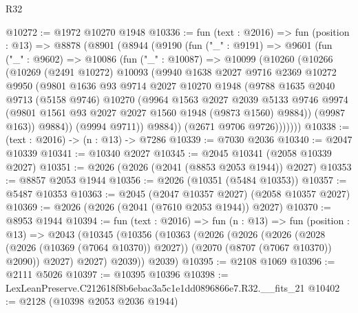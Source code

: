 \begin{lexlean}{R32}
\begin{coremodule}
@10272 := @1972 @10270 @1948
@10336 := fun (text : @2016) =>
  fun (position : @13) =>
  @8878
    (@8901
      (@8944
        (@9190
          (fun ("_" : @9191) =>
          @9601
            (fun ("_" : @9602) =>
            @10086
              (fun ("_" : @10087) =>
              @10099
                (@10260
                  (@10266
                    (@10269
                      (@2491 @10272)
                      @10093
                      (@9940
                        @1638
                        @2027
                        @9716
                        @2369
                        @10272
                        @9950
                        (@9801
                          @1636
                          @93
                          @9714
                          @2027
                          @10270
                          @1948
                          (@9788
                            @1635
                            @2040
                            @9713
                            (@5158 @9746)
                            @10270
                            (@9964
                              @1563
                              @2027
                              @2039
                              @5133
                              @9746
                              @9974
                              (@9801 @1561 @93 @2027 @2027 @1560 @1948 (@9873 @1560) @9884))
                            (@9987 @163))
                          @9884))
                      (@9994 @9711))
                    @9884))
                (@2671 @9706 @9726)))))))
@10338 := (text : @2016) -> (n : @13) -> @7286
@10339 := @7030 @2036
@10340 := @2047 @10339
@10341 := @10340 @2027
@10345 := @2045 @10341 (@2058 @10339 @2027)
@10351 := @2026 (@2026 (@2041 (@8853 @2053 @1944)) @2027)
@10353 := @8857 @2053 @1944
@10356 := @2026 (@10351 (@5484 @10353))
@10357 := @5487 @10353
@10363 := @2045 (@2047 @10357 @2027) (@2058 @10357 @2027)
@10369 := @2026 (@2026 (@2041 (@7610 @2053 @1944)) @2027)
@10370 := @8953 @1944
@10394 := fun (text : @2016) =>
  fun (n : @13) =>
  fun (position : @13) =>
  @2043
    (@10345
      (@10356
        (@10363
          (@2026
            (@2026
              (@2026
                (@2028 (@2026 (@10369 (@7064 @10370)) @2027))
                (@2070 (@8707 (@7067 @10370)) @2090))
              @2027)
            @2027)
          @2039))
      @2039)
@10395 := @2108 @1069
@10396 := @2111 @5026
@10397 := @10395 @10396
@10398 := LexLeanPreserve.C212618f8b6ebac3a5c1e1dd0896866e7.R32.__fits_21
@10402 := @2128 (@10398 @2053 @2036 @1944)

\end{coremodule}
\end{lexlean}
